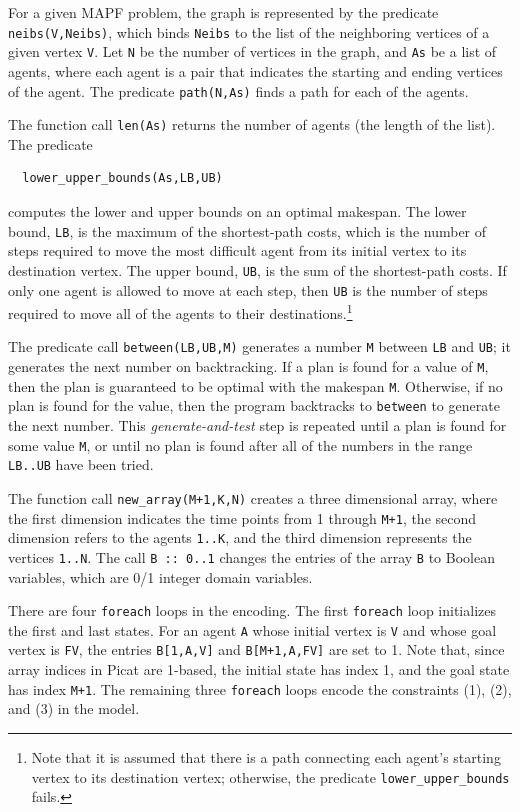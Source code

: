 \documentclass[conference]{IEEEtran}
\begin{document}
For a given MAPF problem, the graph is represented by the predicate \texttt{neibs(V,Neibs)}, which binds \texttt{Neibs} to the list of the neighboring vertices of a given vertex \texttt{V}. Let \texttt{N} be the number of vertices in the graph, and \texttt{As} be a list of agents, where each agent is a pair that indicates the starting and ending vertices of the agent. The predicate \texttt{path(N,As)} finds a path for each of the agents.

The function call \texttt{len(As)} returns the number of agents (the length of the list). The predicate
\begin{verbatim}
  lower_upper_bounds(As,LB,UB)
\end{verbatim}
computes the lower and upper bounds on an optimal makespan. The lower bound, \texttt{LB}, is the maximum of the shortest-path costs, which is the number of steps required to move the most difficult agent from its initial vertex to its destination vertex. The upper bound, \texttt{UB}, is the sum of the shortest-path costs. If only one agent is allowed to move at each step, then \texttt{UB} is the number of steps required to move all of the agents to their destinations.\footnote{Note that it is assumed that there is a path connecting each agent's starting vertex to its destination vertex; otherwise, the predicate \texttt{lower\_upper\_bounds} fails.}

The predicate call \texttt{between(LB,UB,M)} generates a number \texttt{M} between \texttt{LB} and \texttt{UB}; it generates the next number on backtracking. If a plan is found for a value of \texttt{M}, then the plan is guaranteed to be optimal with the makespan \texttt{M}. Otherwise, if no plan is found for the value, then the program backtracks to \texttt{between} to generate the next number. This \textit{generate-and-test} step is repeated until a plan is found for some value \texttt{M}, or until no plan is found after all of the numbers in the range \texttt{LB..UB} have been tried.

The function call \texttt{new\_array(M+1,K,N)} creates a three dimensional array, where the first dimension indicates the time points from 1 through \texttt{M+1}, the second dimension refers to the agents \texttt{1..K}, and the third dimension represents the vertices \texttt{1..N}. The call \texttt{B :: 0..1} changes the entries of the array \texttt{B} to Boolean variables, which are 0/1 integer domain variables.

There are four \texttt{foreach} loops in the encoding. The first \texttt{foreach} loop initializes the first and last states. For an agent \texttt{A} whose initial vertex is \texttt{V} and whose goal vertex is \texttt{FV}, the entries \texttt{B[1,A,V]} and \texttt{B[M+1,A,FV]} are set to 1. Note that, since array indices in Picat are 1-based, the initial state has index 1, and the goal state has index \texttt{M+1}. The remaining three \texttt{foreach} loops encode the constraints (1), (2), and (3) in the model.
\end{document}
